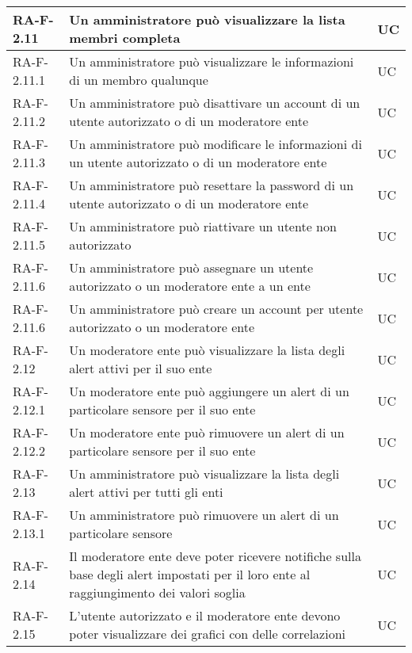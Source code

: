 \begin{center}
\begin{longtable}{|p{3cm}|p{9.85cm}|p{2cm}|}
		{\color{gray} RA-F-}2.11 & Un amministratore può visualizzare la lista membri completa & UC \\ \hline
		{\color{gray} RA-F-}2.11.1 & Un amministratore può visualizzare le informazioni di un membro qualunque & UC \\ \hline
		{\color{gray} RA-F-}2.11.2 & Un amministratore può disattivare un account di un utente autorizzato o di un moderatore ente & UC \\ \hline
		{\color{gray} RA-F-}2.11.3 & Un amministratore può modificare le informazioni di un utente autorizzato o di un moderatore ente & UC \\ \hline
		{\color{gray} RA-F-}2.11.4 & Un amministratore può resettare la password di un utente autorizzato o di un moderatore ente & UC \\ \hline
		{\color{gray} RA-F-}2.11.5 & Un amministratore può riattivare un utente non autorizzato & UC \\ \hline
		{\color{gray} RA-F-}2.11.6 & Un amministratore può assegnare un utente autorizzato o un moderatore ente a un ente & UC \\ \hline
		{\color{gray} RA-F-}2.11.6 & Un amministratore può creare un account per utente autorizzato o un moderatore ente & UC \\ \hline

		{\color{gray} RA-F-}2.12 & Un moderatore ente può visualizzare la lista degli alert attivi per il suo ente & UC \\ \hline
		{\color{gray} RA-F-}2.12.1 & Un moderatore ente può aggiungere un alert di un particolare sensore per il suo ente & UC \\ \hline
		{\color{gray} RA-F-}2.12.2 & Un moderatore ente può rimuovere un alert di un particolare sensore per il suo ente & UC \\ \hline
		{\color{gray} RA-F-}2.13 & Un amministratore può visualizzare la lista degli alert attivi per tutti gli enti & UC \\ \hline
		{\color{gray} RA-F-}2.13.1 & Un amministratore può rimuovere un alert di un particolare sensore & UC \\ \hline
		{\color{gray} RA-F-}2.14 & Il moderatore ente deve poter ricevere notifiche sulla base degli alert impostati per il loro ente al raggiungimento dei valori soglia & UC \\ \hline
		{\color{gray} RA-F-}2.15 & L'utente autorizzato e il moderatore ente devono poter visualizzare dei grafici con delle correlazioni & UC \\ \hline



\end{longtable}
\end{center}
